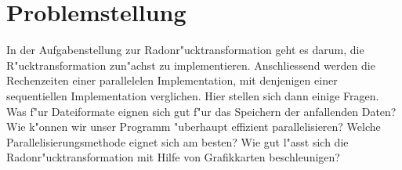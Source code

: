 \section{Problemstellung}
In der Aufgabenstellung zur Radonr"ucktransformation geht es darum, die
R"ucktransformation zun"achst zu implementieren. Anschliessend werden
die Rechenzeiten einer parallelelen Implementation, mit denjenigen
einer sequentiellen Implementation verglichen. Hier stellen sich dann
einige Fragen.
Was f"ur Dateiformate eignen sich gut f"ur das Speichern der
anfallenden Daten? Wie k"onnen wir unser Programm "uberhaupt effizient
parallelisieren? Welche Parallelisierungsmethode eignet sich am
besten? Wie gut l"asst sich die Radonr"ucktransformation mit Hilfe von
Grafikkarten beschleunigen?

